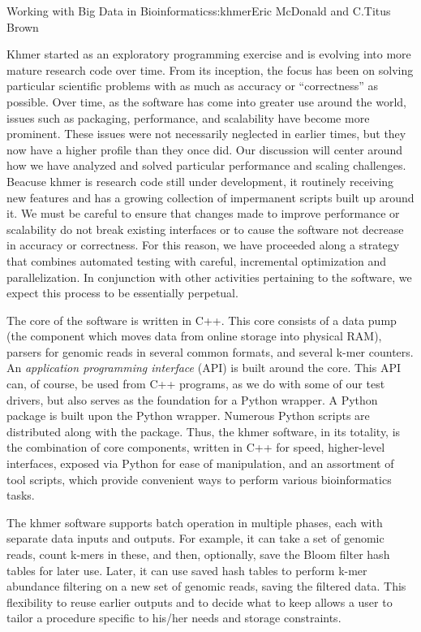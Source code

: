 \begin{aosachapter}{Working with Big Data in Bioinformatics}{s:khmer}{Eric McDonald and C.\/Titus Brown}

Khmer started as an exploratory programming exercise and is evolving
into more mature research code over time. From its inception, the focus
has been on solving particular scientific problems with as much as
accuracy or ``correctness'' as possible. Over time, as the software has
come into greater use around the world, issues such as packaging,
performance, and scalability have become more prominent. These issues
were not necessarily neglected in earlier times, but they now have a
higher profile than they once did. Our discussion will center around how
we have analyzed and solved particular performance and scaling
challenges. Beacuse khmer is research code still under development, it
routinely receiving new features and has a growing collection of
impermanent scripts built up around it. We must be careful to ensure
that changes made to improve performance or scalability do not break
existing interfaces or to cause the software not decrease in accuracy or
correctness. For this reason, we have proceeded along a strategy that
combines automated testing with careful, incremental optimization and
parallelization. In conjunction with other activities pertaining to the
software, we expect this process to be essentially perpetual.


The core of the software is written in C++. This core consists of a data
pump (the component which moves data from online storage into physical
RAM), parsers for genomic reads in several common formats, and several
k-mer counters. An \emph{application programming interface} (API) is
built around the core. This API can, of course, be used from C++
programs, as we do with some of our test drivers, but also serves as the
foundation for a Python wrapper. A Python package is built upon the
Python wrapper. Numerous Python scripts are distributed along with the
package. Thus, the khmer software, in its totality, is the combination
of core components, written in C++ for speed, higher-level interfaces,
exposed via Python for ease of manipulation, and an assortment of tool
scripts, which provide convenient ways to perform various bioinformatics
tasks.

The khmer software supports batch operation in multiple phases, each
with separate data inputs and outputs. For example, it can take a set of
genomic reads, count k-mers in these, and then, optionally, save the
Bloom filter hash tables for later use. Later, it can use saved hash
tables to perform k-mer abundance filtering on a new set of genomic
reads, saving the filtered data. This flexibility to reuse earlier
outputs and to decide what to keep allows a user to tailor a procedure
specific to his/her needs and storage constraints.


\end{aosachapter}
